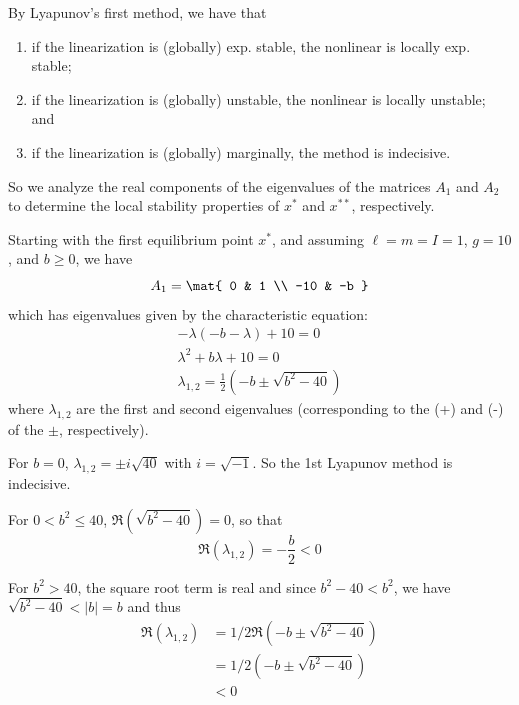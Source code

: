 \documentclass{homework}
\begin{document}
\begin{letterenum}
\item By Lyapunov's first method, we have that
\begin{enumerate}
    \item if the linearization is (globally) exp. stable,
        the nonlinear is locally exp. stable;
    \item if the linearization is (globally) unstable,
        the nonlinear is locally unstable; and
    \item if the linearization is (globally) marginally,
        the method is indecisive.
\end{enumerate}

So we analyze the real components of the eigenvalues of the matrices
$A_1$ and $A_2$ to determine the local stability properties of $x^*$ and
$x^{**}$, respectively.

Starting with the first equilibrium point $x^*$, and assuming
$\ell = m = I = 1$, $g = 10$, and $b \geq 0$, we have
\begin{equation*}
    A_1 = \mat{
        0 & 1 \\
        -10 & -b
    }
\end{equation*}
which has eigenvalues given by the characteristic equation:
\begin{align*}
    -\lambda (-b - \lambda) + 10 = 0 \\
    \lambda^2 + b\lambda + 10 = 0 \\
    \lambda_{1,2} = \frac{1}{2} (-b \pm \sqrt{b^2 - 40})
\end{align*}
where $\lambda_{1,2}$ are the first and second eigenvalues (corresponding
to the (+) and (-) of the $\pm$, respectively).

For $b = 0$, $\lambda_{1,2} = \pm i \sqrt{40}$ with $i = \sqrt{-1}$. So the 1st
Lyapunov method is indecisive.

For $0 < b^2 \leq 40$, $\Re(\sqrt{b^2 - 40}) = 0$, so that 
\begin{equation*}
    \Re(\lambda_{1,2}) = -\frac{b}{2} < 0
\end{equation*}

For $b^2 > 40$, the square root term is real and since $b^2 - 40 < b^2$,
we have $\sqrt{b^2 - 40} < |b| = b$ and thus
\begin{align*}
    \Re(\lambda_{1,2}) &= 1/2 \Re(-b \pm \sqrt{b^2 - 40}) \\
        &= 1/2 (-b \pm \sqrt{b^2 - 40}) \\
        &< 0
\end{align*}


\end{letterenum}
\end{document}
